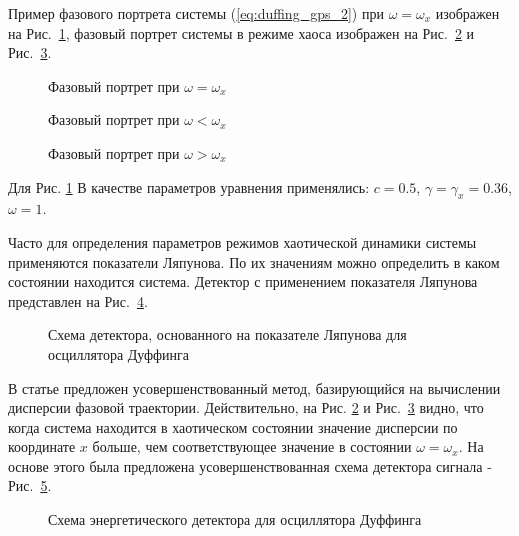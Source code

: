 Пример фазового портрета системы (\ref{eq:duffing_gps_2}) при ${\omega=\omega_{x}}$ изображен на \mbox{Рис. \ref{pic:duffing_sync}},
фазовый портрет системы в режиме хаоса изображен на \mbox{Рис. \ref{pic:duffing_chaos1}} и \mbox{Рис. \ref{pic:duffing_chaos2}}.
\begin{figure}[h]
	\center{}
	\caption{Фазовый портрет при ${\omega =\omega_{x}}$}
	\label{pic:duffing_sync}
\end{figure}
\begin{figure}[h]
	\center{}
	\caption{Фазовый портрет при ${\omega < \omega_{x}}$}
	\label{pic:duffing_chaos1}
\end{figure}
\begin{figure}[h]
	\center{}
	\caption{Фазовый портрет при ${\omega > \omega_{x}}$}
	\label{pic:duffing_chaos2}
\end{figure}
Для Рис. \ref{pic:duffing_sync} В качестве параметров уравнения применялись: $c = 0.5$, $\gamma=\gamma_{x}=0.36$, ${\omega=1}$.

Часто для определения параметров режимов хаотической динамики системы применяются показатели Ляпунова.
По их значениям можно определить в каком состоянии находится система.
Детектор с применением показателя Ляпунова представлен на \mbox{Рис. \ref{pic:chaos_lyapunov}}.
\begin{figure}[h]
	\center{}
	\caption{Схема детектора, основанного на показателе Ляпунова для осциллятора Дуффинга}
	\label{pic:chaos_lyapunov}
\end{figure}

В статье \cite{chaos_chen} предложен усовершенствованный метод, базирующийся на вычислении дисперсии
фазовой траектории. Действительно, на Рис. \mbox{\ref{pic:duffing_chaos1}} и \mbox{Рис. \ref{pic:duffing_chaos2}} видно, что когда система находится в хаотическом состоянии значение
дисперсии по координате ${x}$ больше, чем соответствующее значение в состоянии $\omega = \omega_{x}$.
На основе этого была предложена усовершенствованная схема детектора сигнала - \mbox{Рис. \ref{pic:chaos_energy_detector}}.
\begin{figure}[h]
	\center{}
	\caption{Схема энергетического детектора для осциллятора Дуффинга}
	\label{pic:chaos_energy_detector}
\end{figure}

